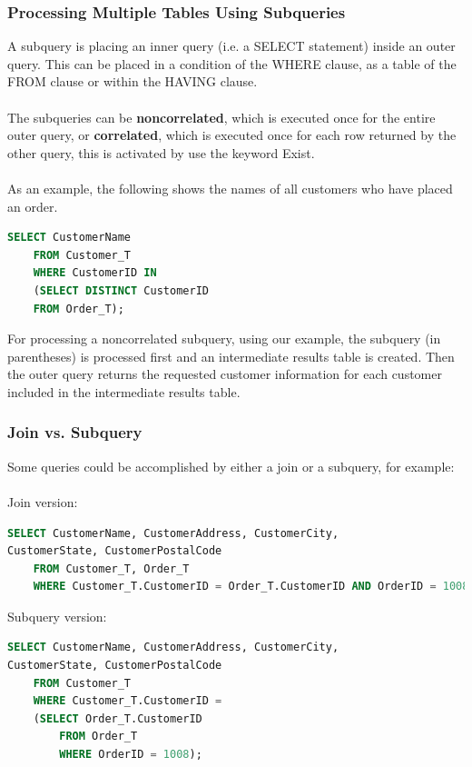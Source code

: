 \documentclass[12pt]{article}
\begin{document}
\subsubsection{Processing Multiple Tables Using Subqueries}

A subquery is placing an inner query (i.e. a SELECT statement) inside an outer query. This can be placed in a condition of the WHERE clause, as a table of the FROM clause or within the HAVING clause.\\
\\
The subqueries can be \textbf{noncorrelated}, which is executed once for the entire outer query, or \textbf{correlated}, which is executed once for each row returned by the other query, this is activated by use the keyword Exist.\\
\\
As an example, the following shows the names of all customers who have placed an order.\\
\begin{lstlisting}[language=SQL]
SELECT CustomerName
	FROM Customer_T
	WHERE CustomerID IN
	(SELECT DISTINCT CustomerID 
	FROM Order_T);

\end{lstlisting}

For processing a noncorrelated subquery, using our example, the subquery (in parentheses) is processed first and an intermediate results table is created. Then the outer query returns the requested customer information for each customer included in the intermediate results table.

\subsubsection{Join vs. Subquery}

Some queries could be accomplished by either a join or a subquery, for example:\\
\\
Join version:
\begin{lstlisting}[language=SQL]
SELECT CustomerName, CustomerAddress, CustomerCity, 
CustomerState, CustomerPostalCode
	FROM Customer_T, Order_T
	WHERE Customer_T.CustomerID = Order_T.CustomerID AND OrderID = 1008;

\end{lstlisting}

Subquery version:
\begin{lstlisting}[language=SQL]
SELECT CustomerName, CustomerAddress, CustomerCity, 
CustomerState, CustomerPostalCode
	FROM Customer_T
	WHERE Customer_T.CustomerID = 
	(SELECT Order_T.CustomerID
		FROM Order_T
		WHERE OrderID = 1008);
\end{lstlisting}
\end{document}
